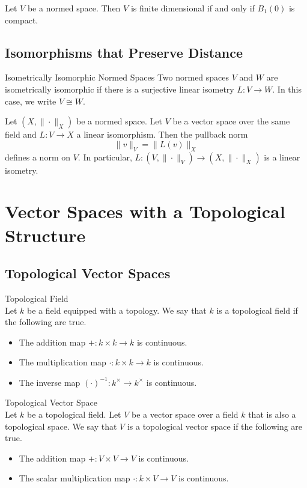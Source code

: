 \documentclass[a4paper]{article}
\begin{document}
\begin{prp}{}{} Let $V$ be a normed space. Then $V$ is finite dimensional if and only if $B_1(0)$ is compact. 
\end{prp}

\subsection{Isomorphisms that Preserve Distance}
\begin{defn}{Isometrically Isomorphic Normed Spaces}{} Two normed spaces $V$ and $W$ are isometrically isomorphic if there is a surjective linear isometry $L:V\to W$. In this case, we write $V\cong W$. 
\end{defn}

\begin{prp}{}{} Let $(X,\|\cdot\|_X)$ be a normed space. Let $V$ be a vector space over the same field and $L:V\to X$ a linear isomorphism. Then the pullback norm $$\|v\|_V=\|L(v)\|_X$$ defines a norm on $V$.  In particular, $L:(V,\|\cdot\|_V)\to(X,\|\cdot\|_X)$ is a linear isometry. 
\end{prp}

\pagebreak
\section{Vector Spaces with a Topological Structure}
\subsection{Topological Vector Spaces}
\begin{defn}{Topological Field}{}\\
Let $k$ be a field equipped with a topology. We say that $k$ is a topological field if the following are true. 
\begin{itemize}
\item The addition map $+:k\times k\to k$ is continuous. 
\item The multiplication map $\cdot:k\times k\to k$ is continuous. 
\item The inverse map $(\cdot)^{-1}:k^\times\to k^\times$ is continuous. 
\end{itemize}
\end{defn}

\begin{defn}{Topological Vector Space}{}\\
Let $k$ be a topological field. Let $V$ be a vector space over a field $k$ that is also a topological space. We say that $V$ is a topological vector space if the following are true. 
\begin{itemize}
\item The addition map $+:V\times V\to V$ is continuous. 
\item The scalar multiplication map $\cdot:k\times V\to V$ is continuous. 
\end{itemize}
\end{defn}
\end{document}
